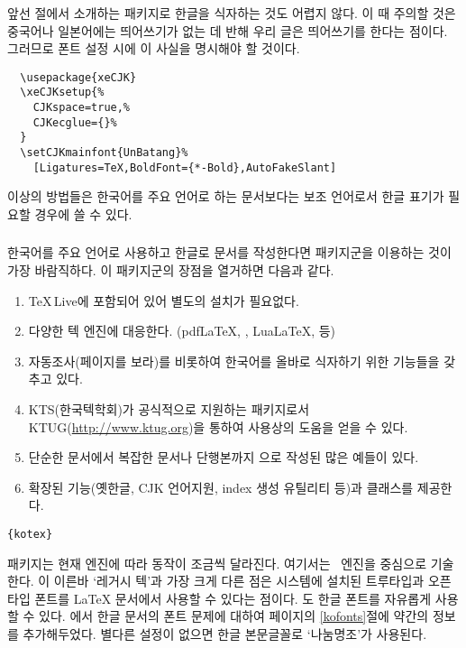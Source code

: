 앞선 절에서 소개하는  패키지로 한글을 식자하는 것도 어렵지 않다. 이 때 주의할 것은
중국어나 일본어에는 띄어쓰기가 없는 데 반해 우리 글은 띄어쓰기를 한다는 점이다. 그러므로 폰트 설정 시에 
이 사실을 명시해야 할 것이다.

\begin{verbatim}
  \usepackage{xeCJK}
  \xeCJKsetup{%
    CJKspace=true,%
    CJKecglue={}%
  }
  \setCJKmainfont{UnBatang}%
    [Ligatures=TeX,BoldFont={*-Bold},AutoFakeSlant]
\end{verbatim}

이상의 방법들은 한국어를 주요 언어로 하는 문서보다는 보조 언어로서 한글 표기가 필요할 경우에 쓸 수 있다.

\subsubsection[kotex]{\texorpdfstring{\koTeX}{koTeX}}
한국어를 주요 언어로 사용하고 한글로 문서를 작성한다면  패키지군을 이용하는 것이 가장 바람직하다.
이 패키지군의 장점을 열거하면 다음과 같다.
\begin{enumerate} \firmlist
  \item \TeX\,Live에 포함되어 있어 별도의 설치가 필요없다.
  \item 다양한 텍 엔진에 대응한다. (pdf\LaTeX, \XeLaTeX, Lua\LaTeX,  등)
  \item 자동조사(\pageref{autojosa}페이지를 보라)를 비롯하여 한국어를 올바로 식자하기 위한 기능들을 갖추고 있다.
  \item KTS(한국텍학회)가 공식적으로 지원하는 패키지로서 KTUG(\url{http://www.ktug.org})을 통하여 사용상의 도움을 얻을 수 있다.
  \item 단순한 문서에서 복잡한 문서나 단행본까지 으로 작성된 많은 예들이 있다.
  \item 확장된 기능(옛한글, CJK 언어지원, index 생성 유틸리티 등)과 클래스를 제공한다.
\end{enumerate}

\begin{lscommand}
  \texttt{\{kotex\}}
\end{lscommand}

 패키지는 현재 엔진에 따라 동작이 조금씩 달라진다. 여기서는 \XeLaTeX\ 엔진을 중심으로 기술한다.
\XeLaTeX 이 이른바 `레거시 텍'과 가장 크게 다른 점은 시스템에 설치된 트루타입과 오픈타입 폰트를 \LaTeX{} 문서에서 사용할 수 있다는 점이다. \koTeX 도 한글 폰트를 자유롭게 사용할 수 있다. \XeLaTeX 에서 한글 문서의 폰트 문제에 대하여 \pageref{kofonts}페이지의 \ref{kofonts}절에 약간의 정보를 추가해두었다. 별다른 설정이 없으면 한글 본문글꼴로 `나눔명조'가 사용된다.

